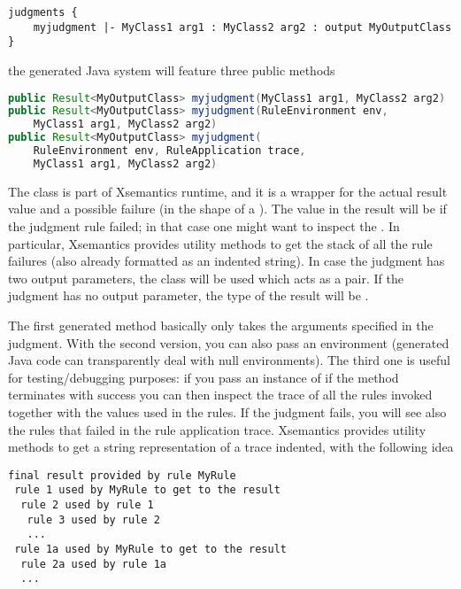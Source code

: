 \begin{lstlisting}[language=xsemantics] 
judgments {
	myjudgment |- MyClass1 arg1 : MyClass2 arg2 : output MyOutputClass
}
\end{lstlisting}

\noindent
the generated Java system will feature three public methods

\begin{lstlisting}[language=Java] 
public Result<MyOutputClass> myjudgment(MyClass1 arg1, MyClass2 arg2)
public Result<MyOutputClass> myjudgment(RuleEnvironment env,
	MyClass1 arg1, MyClass2 arg2)
public Result<MyOutputClass> myjudgment(
	RuleEnvironment env, RuleApplication trace,
	MyClass1 arg1, MyClass2 arg2)
\end{lstlisting}

The class  is part of Xsemantics runtime, and it is a wrapper for
the actual result value and a possible failure (in the shape of a \failedexc).
The value in the result will be  if the judgment rule failed; in that
case one might want to inspect the \failedexc.
In particular, Xsemantics provides utility methods to get the stack of all the
rule failures (also already formatted as an indented string).
In case the judgment has two output parameters, the class
 will be used which acts as a pair.
If the judgment has no output parameter, the type of the result will
be .

The first generated method basically only takes the arguments specified in the
judgment.  With the second version, you can also pass an environment
(generated Java code can transparently deal with null environments).
The third one is useful for testing/debugging purposes: if you pass
an instance of  if the
method terminates with success you can then inspect the trace of all the rules
invoked together with the values used in the rules.  If the judgment fails,
you will see also the rules that failed in the rule application trace.
Xsemantics provides utility methods to get a string representation of a trace
indented, with the following idea

\begin{footnotesize}
\begin{verbatim}
final result provided by rule MyRule
 rule 1 used by MyRule to get to the result
  rule 2 used by rule 1
   rule 3 used by rule 2
   ...
 rule 1a used by MyRule to get to the result
  rule 2a used by rule 1a
  ...
\end{verbatim}
\end{footnotesize}
